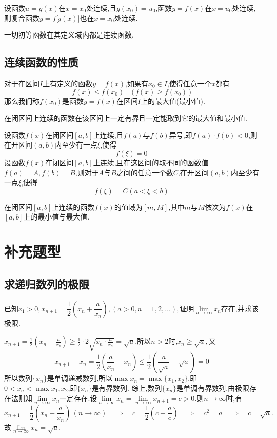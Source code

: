 \theorem[复合函数的连续性\uppercase\expandafter{\romannumeral2}]
设函数$u=g(x)$在$x=x_0$处连续,且$g(x_0)=u_0$,函数$y=f(x)$在$x=u_0$处连续,则复合函数$y=f\big[g(x)\big]$也在$x=x_0$处连续.\jg

\theorem[初等函数的连续性]
一切初等函数在其定义域内都是连续函数.\jg

\subsection{连续函数的性质}
	
	对于在区间$I$上有定义的函数$y=f(x)$,如果有$x_0 \in I$,使得任意一个$x$都有
	\[
	f(x)\le f(x_0)\quad\big(\,f(x) \geq f(x_0) \,\big)
	\]
	那么我们称$f(x_0)$是函数$y=f(x)$在区间$I$上的最大值(最小值).
	\jg
	
	\theorem[最大值最小值定理]
	在闭区间上连续的函数在该区间上一定有界且一定能取到它的最大值和最小值.
	
	\jg
	\theorem[零点存在性定理]
	设函数$f(x)$在闭区间$[a,b]$上连续,且$f(a)$与$f(b)$异号,即$f(a)\cdot f(b)<0$,则在开区间$(a,b)$内至少有一点$\xi$,使得
	\[
	f(\xi)=0
	\]
	\newpage
	\theorem[介值定理]
	设函数$f(x)$在闭区间$[a,b]$上连续,且在这区间的取不同的函数值$f(a)=A,f(b)=B$,则对于$A$与$B$之间的任意一个数$C$,在开区间$(a,b)$内至少有一点$\xi$,使得
	\[
	f(\xi)=C(a<\xi<b)
	\]
	
	\tl 在闭区间$[a,b]$上连续的函数$f(x)$的值域为$[m,M]$,其中$m$与$M$依次为$f(x)$在$[a,b]$上的最小值与最大值.

\section{补充题型}
\subsection{求递归数列的极限}
\texample[求递归数列的极限]\sj
\examples 已知$x_1>0,x_{n+1}=\dfrac{1}{2}\left(x_n+\dfrac{a}{x_n}\right),(a>0,n=1,2,\ldots),$证明$\lim\limits_{n \to \infty} x_n$存在,并求该极限.

\solve $\displaystyle x_{n+1}=\frac 12\left(x_n+\frac{a}{x_n}\right)\ge \frac 12 \cdot 2\sqrt{x_n\cdot \frac{a}{x_n}}=\sqrt{a}$,所以$n>2$时,$x_n \ge \sqrt{a},$又
\[
x_{n+1}-x_n=\frac{1}{2}\left(\frac{a}{x_n}-x_n\right)\le\frac{1}{2}\left(\frac{a}{\sqrt{a}}-\sqrt{a}\right)=0
\]
所以数列$\{x_n\}$是单调递减数列,所以$\max x_n=\max\{x_1,x_2\}$,即$0<x_n<\max{x_1,x_2}$,即$\{x_n\}$是有界数列.
综上,数列$\{x_n\}$是单调有界数列,由极限存在法则知$\lim\limits_{n \to \infty}x_n$一定存在.设$\lim\limits_{n \to \infty}x_n=\lim\limits_{n \to \infty}x_{n+1}=c>0.$则$n \to \infty$时,有
\[
x_{n+1}=\frac{1}{2}\left(x_n+\frac{a}{x_n}\right)\,(n \to \infty) \quad \Rightarrow \quad c=\frac 12\left( c+\frac ac \right) \quad \Rightarrow \quad c^2=a \quad \Rightarrow \quad c=\sqrt{a}. 
\]
故$\lim\limits_{n \to \infty}x_n=\sqrt{a}.$

